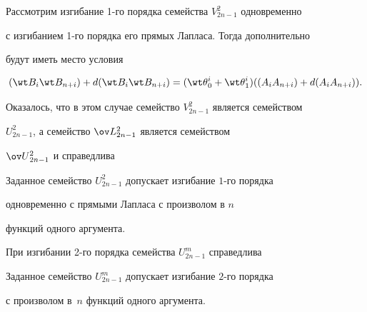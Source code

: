  


Рассмотрим изгибание 1-го порядка семейства $V^2_{2n-1}$ одновременно 


с изгибанием 1-го порядка его прямых Лапласа. Тогда дополнительно 


будут иметь место условия 


$$ 


(\wt B_i\wt B_{n+i})+d(\wt B_i\wt B_{n+i})= 


(\wt\theta{}^i_0+\wt\theta{}^i_1)((A_i A_{n+i})+ 


d(A_i A_{n+i})). 


$$ 


Оказалось, что в этом случае семейство $V^2_{2n-1}$ является семейством 


$U^2_{2n-1}$, а семейство $\ov L{}^2_{2n-1}$ является семейством 


$\ov U{}^2_{2n-1}$ и справедлива 


 


\begin{thm} 


Заданное семейство $U^2_{2n-1}$ допускает изгибание $1$-го порядка 


одновременно с прямыми Лапласа с произволом в $n$ 


функций одного аргумента. 


\end{thm} 


 


При изгибании 2-го порядка семейства $U^m_{2n-1}$ справедлива 


 


\begin{thm} 


Заданное семейство $U^m_{2n-1}$ допускает изгибание $2$-го порядка 


с произволом в~$n$ функций одного аргумента. 


\end{thm} 


 


